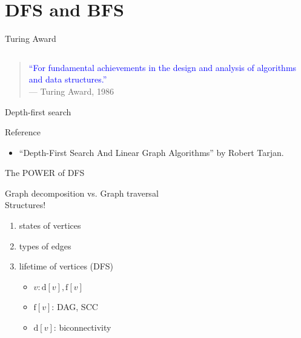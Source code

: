 \section{DFS and BFS}

\begin{frame}{Turing Award}
  \begin{columns}
  \end{columns}

  \vspace{0.50cm}
  \begin{quote}
	\textcolor{blue}{``For fundamental achievements in the design and analysis of algorithms and data structures.''} \\
	\hfill --- Turing Award, 1986
  \end{quote}
\end{frame}
\begin{frame}{Depth-first search}


  \begin{alertblock}{Reference}
	\begin{itemize}
	  \item ``Depth-First Search And Linear Graph Algorithms'' by Robert Tarjan.
	\end{itemize}
  \end{alertblock}
\end{frame}
\begin{frame}{The POWER of DFS} 
  \begin{center}
	Graph decomposition vs. Graph traversal \\[10pt]
	Structures!
  \end{center}

  \pause
  \begin{enumerate}
	\item states of vertices
	\item types of edges
	\item lifetime of vertices (DFS)
	  \begin{itemize}
	    \item $v: \text{d}[v], \text{f}[v]$
	    \item $\text{f}[v]$: DAG, SCC
	    \item $\text{d}[v]$: biconnectivity
	  \end{itemize}
  \end{enumerate}
\end{frame}
